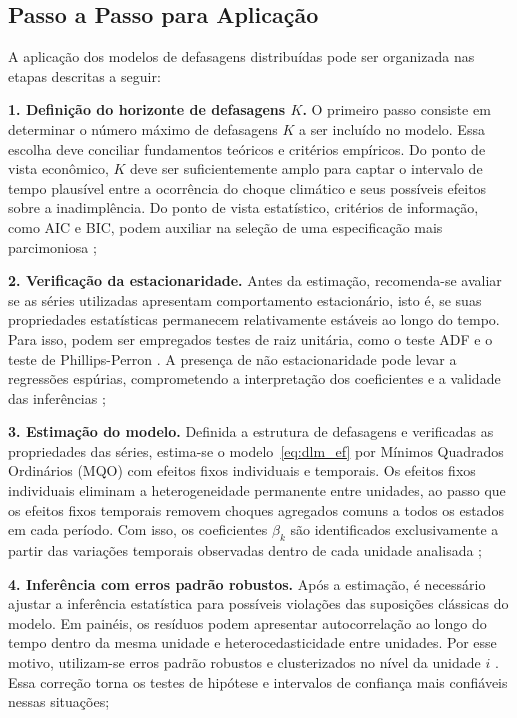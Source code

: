 \subsection{Passo a Passo para Aplicação}

A aplicação dos modelos de defasagens distribuídas pode ser organizada nas etapas
descritas a seguir:

\textbf{1. Definição do horizonte de defasagens $K$.} O primeiro passo consiste em
determinar o número máximo de defasagens $K$ a ser incluído no modelo. Essa escolha
deve conciliar fundamentos teóricos e critérios empíricos. Do ponto de vista
econômico, $K$ deve ser suficientemente amplo para captar o intervalo de tempo
plausível entre a ocorrência do choque climático e seus possíveis efeitos sobre a
inadimplência. Do ponto de vista estatístico, critérios de informação, como AIC e
BIC, podem auxiliar na seleção de uma especificação mais parcimoniosa
\citep{wooldridge2010};

\textbf{2. Verificação da estacionaridade.} Antes da estimação, recomenda-se avaliar
se as séries utilizadas apresentam comportamento estacionário, isto é, se suas
propriedades estatísticas permanecem relativamente estáveis ao longo do tempo. Para
isso, podem ser empregados testes de raiz unitária, como o teste ADF
\citep{dickey1979} e o teste de Phillips-Perron \citep{phillips1988}. A presença de
não estacionaridade pode levar a regressões espúrias, comprometendo a interpretação
dos coeficientes e a validade das inferências \citep{greene2012};

\textbf{3. Estimação do modelo.} Definida a estrutura de defasagens e verificadas as propriedades das séries, estima-se o modelo~\eqref{eq:dlm_ef} por Mínimos Quadrados Ordinários (MQO) com efeitos fixos individuais e temporais. Os efeitos fixos individuais eliminam a heterogeneidade permanente entre unidades, ao passo que os efeitos fixos temporais removem choques agregados comuns a todos os estados em cada período. Com isso, os coeficientes $\beta_k$ são identificados exclusivamente a partir das variações temporais observadas dentro de cada unidade analisada \citep{wooldridge2010};

\textbf{4. Inferência com erros padrão robustos.} Após a estimação, é necessário
ajustar a inferência estatística para possíveis violações das suposições clássicas do
modelo. Em painéis, os resíduos podem apresentar autocorrelação ao longo do tempo
dentro da mesma unidade e heterocedasticidade entre unidades. Por esse motivo,
utilizam-se erros padrão robustos e clusterizados no nível da unidade $i$
\citep{wooldridge2010}. Essa correção torna os testes de hipótese e intervalos de
confiança mais confiáveis nessas situações;

